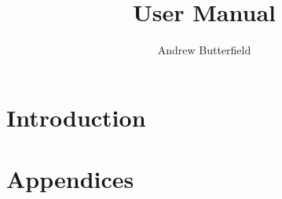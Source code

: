 \documentclass[fleqn]{report}
\author{
  Andrew Butterfield%
  }
\title{\UTP2
  User Manual
}
\begin{document}


\maketitle
\tableofcontents


\chapter{Introduction}



\newpage






\appendix
\chapter{Appendices}

%
%
%
\end{document}
